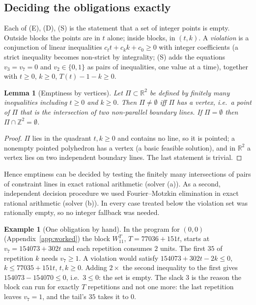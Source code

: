 \documentclass[11pt,a4paper]{article}
\newtheorem{lemma}[theorem]{Lemma}
\theoremstyle{definition}
\newtheorem{example}[theorem]{Example}
\newcommand{\Z}{\mathbb{Z}}
\newcommand{\Wb}{W_{11}}
\begin{document}
\subsection{Deciding the obligations exactly}
Each of (E), (D), (S) is the statement that a set of integer points is empty. Outside blocks the points are in $t$ alone; inside blocks, in $(t,k)$. A \emph{violation} is a conjunction of linear inequalities $c_tt+c_kk+c_0\ge0$ with integer coefficients (a strict inequality becomes non-strict by integrality; (S) adds the equations $v_3=v_7=0$ and $v_2\in\{0,1\}$ as pairs of inequalities, one value at a time), together with $t\ge0$, $k\ge0$, $T(t)-1-k\ge0$.

\begin{lemma}[Emptiness by vertices]\label{lem:vertex}
Let $\Pi\subset\mathbb{R}^2$ be defined by finitely many inequalities including $t\ge0$ and $k\ge0$. Then $\Pi\ne\emptyset$ iff $\Pi$ has a vertex, i.e.\ a point of $\Pi$ that is the intersection of two non-parallel boundary lines. If $\Pi=\emptyset$ then $\Pi\cap\Z^2=\emptyset$.
\end{lemma}
\begin{proof}
$\Pi$ lies in the quadrant $t,k\ge0$ and contains no line, so it is pointed; a nonempty pointed polyhedron has a vertex (a basic feasible solution), and in $\mathbb{R}^2$ a vertex lies on two independent boundary lines. The last statement is trivial.
\end{proof}

Hence emptiness can be decided by testing the finitely many intersections of pairs of constraint lines in exact rational arithmetic (solver (a)). As a second, independent decision procedure we used Fourier--Motzkin elimination in exact rational arithmetic (solver (b)). In every case treated below the violation set was rationally empty, so no integer fallback was needed.

\begin{example}[One obligation by hand]\label{ex:oblig}
In the program for $(0,0)$ (Appendix~\ref{app:worked}) the block $\Wb^{T}$, $T=77036+151t$, starts at $v_7=154073+302t$ and each repetition consumes $2$ units. The first $35$ of repetition $k$ needs $v_7\ge1$. A violation would satisfy $154073+302t-2k\le0$, $k\le 77035+151t$, $t,k\ge0$. Adding $2\times$ the second inequality to the first gives $154073-154070\le0$, i.e.\ $3\le0$: the set is empty. The slack $3$ is the reason the block can run for exactly $T$ repetitions and not one more: the last repetition leaves $v_7=1$, and the tail's $35$ takes it to $0$.
\end{example}
\end{document}
